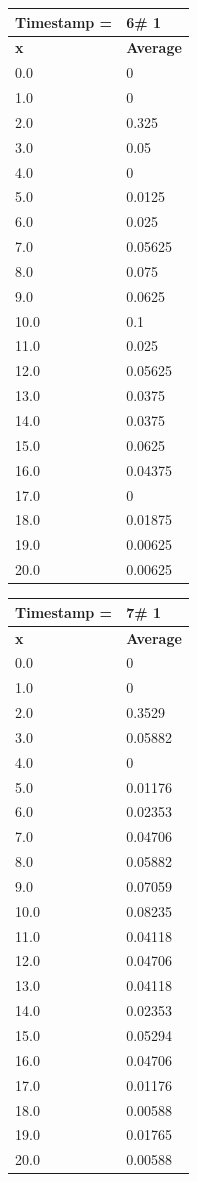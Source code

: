 \begin{tabular}{|l||l|}
\hline
\textbf{Timestamp =} & \textbf{6}\# 1\\\hline
	\textbf{x} & \textbf{Average} \\ \hline
\hline
	0.0 & 0 \\ \hline
	1.0 & 0 \\ \hline
	2.0 & 0.325 \\ \hline
	3.0 & 0.05 \\ \hline
	4.0 & 0 \\ \hline
	5.0 & 0.0125 \\ \hline
	6.0 & 0.025 \\ \hline
	7.0 & 0.05625 \\ \hline
	8.0 & 0.075 \\ \hline
	9.0 & 0.0625 \\ \hline
	10.0 & 0.1 \\ \hline
	11.0 & 0.025 \\ \hline
	12.0 & 0.05625 \\ \hline
	13.0 & 0.0375 \\ \hline
	14.0 & 0.0375 \\ \hline
	15.0 & 0.0625 \\ \hline
	16.0 & 0.04375 \\ \hline
	17.0 & 0 \\ \hline
	18.0 & 0.01875 \\ \hline
	19.0 & 0.00625 \\ \hline
	20.0 & 0.00625 \\ \hline
\end{tabular}
\begin{tabular}{|l||l|}
\hline
\textbf{Timestamp =} & \textbf{7}\# 1\\\hline
	\textbf{x} & \textbf{Average} \\ \hline
\hline
	0.0 & 0 \\ \hline
	1.0 & 0 \\ \hline
	2.0 & 0.3529 \\ \hline
	3.0 & 0.05882 \\ \hline
	4.0 & 0 \\ \hline
	5.0 & 0.01176 \\ \hline
	6.0 & 0.02353 \\ \hline
	7.0 & 0.04706 \\ \hline
	8.0 & 0.05882 \\ \hline
	9.0 & 0.07059 \\ \hline
	10.0 & 0.08235 \\ \hline
	11.0 & 0.04118 \\ \hline
	12.0 & 0.04706 \\ \hline
	13.0 & 0.04118 \\ \hline
	14.0 & 0.02353 \\ \hline
	15.0 & 0.05294 \\ \hline
	16.0 & 0.04706 \\ \hline
	17.0 & 0.01176 \\ \hline
	18.0 & 0.00588 \\ \hline
	19.0 & 0.01765 \\ \hline
	20.0 & 0.00588 \\ \hline
\end{tabular}

